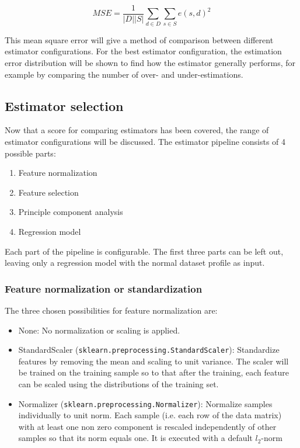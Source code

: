 \begin{equation}
	MSE = \frac{1}{|D||S|} \sum_{d \in D} \sum_{s \in S} e(s, d)^2
\end{equation}

This mean square error will give a method of comparison between different estimator configurations. For the best estimator configuration, the estimation error distribution will be shown to find how the estimator generally performs, for example by comparing the number of over- and under-estimations.

\subsection{Estimator selection}
\label{subsec:estimatorselection}
Now that a score for comparing estimators has been covered, the range of estimator configurations will be discussed.
The estimator pipeline consists of 4 possible parts:
\begin{enumerate}
	\item Feature normalization
	\item Feature selection
	\item Principle component analysis
	\item Regression model
\end{enumerate}

Each part of the pipeline is configurable. The first three parts can be left out, leaving only a regression model with the normal dataset profile as input. 

\subsubsection{Feature normalization or standardization}
The three chosen possibilities for feature normalization are:
\begin{itemize}
	\item None: No normalization or scaling is applied.
	\item StandardScaler (\verb|sklearn.preprocessing.StandardScaler|): Standardize features by removing the mean and scaling to unit variance. The scaler will be trained on the training sample so to that after the training, each feature can be scaled using the distributions of the training set.
	\item Normalizer (\verb|sklearn.preprocessing.Normalizer|): Normalize samples individually to unit norm. Each sample (i.e. each row of the data matrix) with at least one non zero component is rescaled independently of other samples so that its norm equals one. It is executed with a default $l_2$-norm
\end{itemize}

